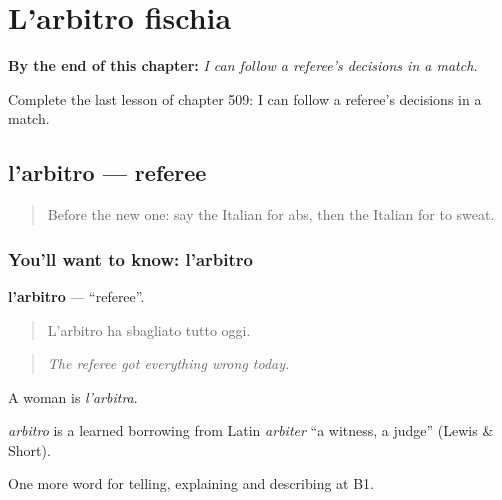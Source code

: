 
\chapter{L'arbitro fischia}
\label{ch:it-l-arbitro-fischia}

\begin{chapteropening}
\textbf{By the end of this chapter:} \emph{I can follow a referee's decisions in a match.}

Complete the last lesson of chapter 509: I can follow a referee's decisions in a match.
\end{chapteropening}

\section[l'arbitro]{l'arbitro — referee}

\label{lesson:IT-C509-arbitro}



\begin{quote}
Before the new one: say the Italian for abs, then the Italian for to sweat.
\end{quote}

\subsection*{You'll want to know: l'arbitro}
\textbf{l'arbitro} — \textquotedblleft{}referee\textquotedblright{}.

\begin{quote}
L'arbitro ha sbagliato tutto oggi.
\end{quote}

\begin{quote}
\emph{The referee got everything wrong today.}
\end{quote}

A woman is \emph{l'arbitra}.

\begin{cousinweb}
\emph{arbitro} is a learned borrowing from Latin \emph{arbiter} \textquotedblleft{}a witness, a judge\textquotedblright{} (Lewis \& Short).
\end{cousinweb}

\begin{grammarlens}[title={What you've built}]
One more word for telling, explaining and describing at B1.
\end{grammarlens}

